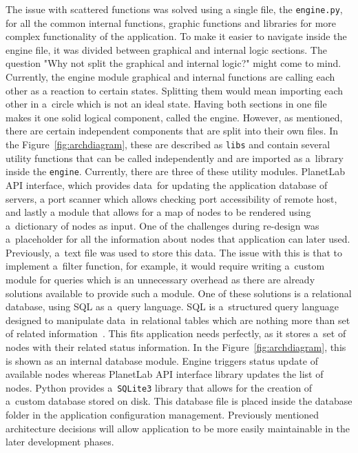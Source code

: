 The issue with scattered functions was solved using a single file, the \texttt{engine.py}, for all the common internal functions, graphic functions and libraries for more complex functionality of the application. To make it easier to navigate inside the engine file, it was divided between graphical and internal logic sections. The question "Why not split the graphical and internal logic?" might come to mind. Currently, the engine module graphical and internal functions are calling each other as a reaction to certain states. Splitting them would mean importing each other in a~circle which is not an ideal state. Having both sections in one file makes it one solid logical component, called the engine. However, as mentioned, there are certain independent components that are split into their own files. In the Figure~\ref{fig:archdiagram}, these are described as \texttt{libs} and contain several utility functions that can be called independently and are imported as a~library inside the \texttt{engine}. Currently, there are three of these utility modules. PlanetLab API interface, which provides data~for updating the application database of servers, a port scanner which allows checking port accessibility of remote host, and lastly a module that allows for a map of nodes to be rendered using a~dictionary of nodes as input. One of the challenges during re-design was a~placeholder for all the information about nodes that application can later used. Previously, a~text file was used to store this data. The issue with this is that to implement a~filter function, for example, it would require writing a~custom module for queries which is an unnecessary overhead as there are already solutions available to provide such a module. One of these solutions is a relational database, using SQL as a~query language. SQL is a~structured query language designed to manipulate data~in relational tables which are nothing more than set of related information~\cite{Beaulieu:2005:LS:1098720}. This fits application needs perfectly, as it stores a~set of nodes with their related status information. In the Figure~\ref{fig:archdiagram}, this is shown as an internal database module. Engine triggers status update of available nodes whereas PlanetLab API interface library updates the list of nodes. Python provides a~\texttt{SQLite3} library that allows for the creation of a~custom database stored on disk. This database file is placed inside the database folder in the application configuration management. Previously mentioned architecture decisions will allow application to be more easily maintainable in the later development phases.\\

